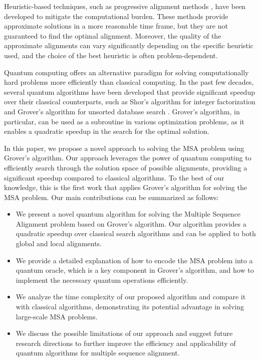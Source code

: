 Heuristic-based techniques, such as progressive alignment methods \cite{progressive_alignment}, have been developed to mitigate the computational burden. These methods provide approximate solutions in a more reasonable time frame, but they are not guaranteed to find the optimal alignment. Moreover, the quality of the approximate alignments can vary significantly depending on the specific heuristic used, and the choice of the best heuristic is often problem-dependent.

Quantum computing offers an alternative paradigm for solving computationally hard problems more efficiently than classical computing. In the past few decades, several quantum algorithms have been developed that provide significant speedup over their classical counterparts, such as Shor's algorithm for integer factorization \cite{shor} and Grover's algorithm for unsorted database search \cite{grover}. Grover's algorithm, in particular, can be used as a subroutine in various optimization problems, as it enables a quadratic speedup in the search for the optimal solution.

In this paper, we propose a novel approach to solving the MSA problem using Grover's algorithm. Our approach leverages the power of quantum computing to efficiently search through the solution space of possible alignments, providing a significant speedup compared to classical algorithms. To the best of our knowledge, this is the first work that applies Grover's algorithm for solving the MSA problem. Our main contributions can be summarized as follows:

\begin{itemize}
    \item We present a novel quantum algorithm for solving the Multiple Sequence Alignment problem based on Grover's algorithm. Our algorithm provides a quadratic speedup over classical search algorithms and can be applied to both global and local alignments.
    
    \item We provide a detailed explanation of how to encode the MSA problem into a quantum oracle, which is a key component in Grover's algorithm, and how to implement the necessary quantum operations efficiently.

    \item We analyze the time complexity of our proposed algorithm and compare it with classical algorithms, demonstrating its potential advantage in solving large-scale MSA problems.
    
    \item We discuss the possible limitations of our approach and suggest future research directions to further improve the efficiency and applicability of quantum algorithms for multiple sequence alignment.
\end{itemize}


